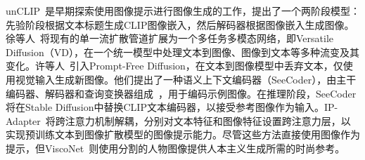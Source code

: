 unCLIP~\cite{Ramesh2022HierarchicalTI}是早期探索使用图像提示进行图像生成的工作，提出了一个两阶段模型：先验阶段根据文本标题生成CLIP图像嵌入，然后解码器根据图像嵌入生成图像。徐等人~\cite{xu2023versatile}将现有的单一流扩散管道扩展为一个多任务多模态网络，即Versatile Diffusion（VD），在一个统一模型中处理文本到图像、图像到文本等多种流变及其变化。许等人~\cite{xu2023prompt}引入Prompt-Free Diffusion，在文本到图像模型中丢弃文本，仅使用视觉输入生成新图像。他们提出了一种语义上下文编码器（SeeCoder），由主干编码器、解码器和查询变换器组成~\cite{Li2023BLIP2BL}，用于编码示例图像。在推理阶段，SeeCoder将在Stable Diffusion中替换CLIP文本编码器，以接受参考图像作为输入。IP-Adapter~\cite{ye2023ip}将跨注意力机制解耦，分别对文本特征和图像特征设置跨注意力层，以实现预训练文本到图像扩散模型的图像提示能力。尽管这些方法直接使用图像作为提示，但ViscoNet~\cite{cheong2023visconet}则使用分割的人物图像提供人本主义生成所需的时尚参考。
